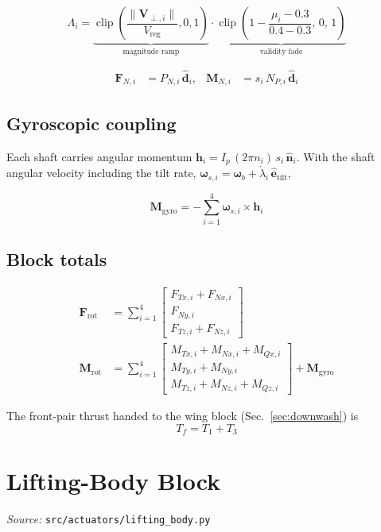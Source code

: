\documentclass[11pt,a4paper]{article}
\newcommand{\vect}[1]{\bm{#1}}
\newcommand{\unit}[1]{\hat{\bm{#1}}}
\newcommand{\clip}{\operatorname{clip}}
\begin{document}
\begin{equation}
\Lambda_i=
\underbrace{\clip\!\left(\frac{\lVert\vect V_{\perp,i}\rVert}{V_{\!\mathrm{reg}}},0,1\right)}_{\text{magnitude ramp}}
\cdot
\underbrace{\clip\!\left(1-\frac{\mu_i-0.3}{0.4-0.3},\,0,\,1\right)}_{\text{validity fade}}
\end{equation}

\begin{align}
\vect F_{N,i}&=P_{N,i}\,\unit d_i, &
\vect M_{N,i}&=s_i\,N_{P,i}\,\unit d_i
\end{align}

\subsection{Gyroscopic coupling}
Each shaft carries angular momentum $\vect h_i=I_p\,(2\pi n_i)\,s_i\,\unit n_i$.
With the shaft angular velocity including the tilt rate,
$\vect\omega_{s,i}=\vect\omega_{b}+\dot\lambda_i\,\unit e_{\mathrm{tilt}}$,

\begin{equation}
\vect M_{\mathrm{gyro}}=-\sum_{i=1}^{4}\vect\omega_{s,i}\times\vect h_i
\end{equation}

\subsection{Block totals}
\begin{align}
\vect F_{\mathrm{rot}}&=\sum_{i=1}^{4}
\begin{bmatrix}F_{Tx,i}+F_{Nx,i}\\ F_{Ny,i}\\ F_{Tz,i}+F_{Nz,i}\end{bmatrix}\\[2mm]
\vect M_{\mathrm{rot}}&=\sum_{i=1}^{4}
\begin{bmatrix}
M_{Tx,i}+M_{Nx,i}+M_{Qx,i}\\
M_{Ty,i}+M_{Ny,i}\\
M_{Tz,i}+M_{Nz,i}+M_{Qz,i}
\end{bmatrix}+\vect M_{\mathrm{gyro}}
\end{align}

The front-pair thrust handed to the wing block (Sec.~\ref{sec:downwash}) is
\begin{equation}
T_f=T_1+T_3
\end{equation}

\section{Lifting-Body Block}
\emph{Source:} \texttt{src/actuators/lifting\_body.py}
\end{document}
